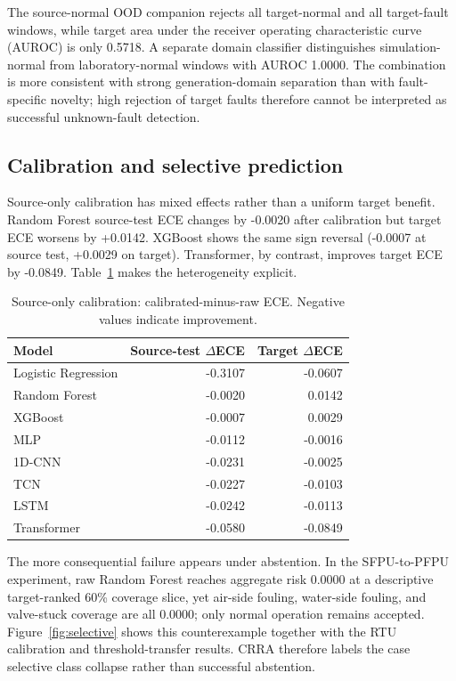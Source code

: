 \documentclass[preprint,12pt]{elsarticle}
\begin{document}
The source-normal OOD companion rejects all target-normal and all target-fault windows, while target area under the receiver operating characteristic curve (AUROC) is only 0.5718. A separate domain classifier distinguishes simulation-normal from laboratory-normal windows with AUROC 1.0000. The combination is more consistent with strong generation-domain separation than with fault-specific novelty; high rejection of target faults therefore cannot be interpreted as successful unknown-fault detection.

\subsection{Calibration and selective prediction}
Source-only calibration has mixed effects rather than a uniform target benefit. Random Forest source-test ECE changes by -0.0020 after calibration but target ECE worsens by +0.0142. XGBoost shows the same sign reversal (-0.0007 at source test, +0.0029 on target). Transformer, by contrast, improves target ECE by -0.0849. Table~\ref{tab:cal} makes the heterogeneity explicit.

\begin{table}[H]
\centering
\caption{Source-only calibration: calibrated-minus-raw ECE. Negative values indicate improvement.}
\label{tab:cal}
\small
\begin{tabular}{lrr}
\toprule
Model & Source-test $\Delta$ECE & Target $\Delta$ECE\\
\midrule
Logistic Regression & -0.3107 & -0.0607\\
Random Forest        & -0.0020 &  0.0142\\
XGBoost              & -0.0007 &  0.0029\\
MLP                  & -0.0112 & -0.0016\\
1D-CNN               & -0.0231 & -0.0025\\
TCN                  & -0.0227 & -0.0103\\
LSTM                 & -0.0242 & -0.0113\\
Transformer          & -0.0580 & -0.0849\\
\bottomrule
\end{tabular}
\end{table}

The more consequential failure appears under abstention. In the SFPU-to-PFPU experiment, raw Random Forest reaches aggregate risk 0.0000 at a descriptive target-ranked 60\% coverage slice, yet air-side fouling, water-side fouling, and valve-stuck coverage are all 0.0000; only normal operation remains accepted. Figure~\ref{fig:selective} shows this counterexample together with the RTU calibration and threshold-transfer results. CRRA therefore labels the case selective class collapse rather than successful abstention.
\end{document}
